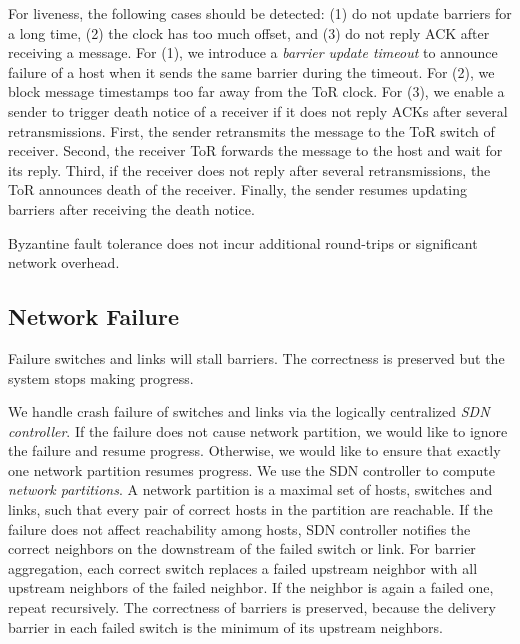 {For liveness, the following cases should be detected: (1) do not update barriers for a long time, (2) the clock has too much offset, and (3) do not reply ACK after receiving a message.
For (1), we introduce a \emph{barrier update timeout} to announce failure of a host when it sends the same barrier during the timeout. %
For (2), we block message timestamps too far away from the ToR clock.
For (3), we enable a sender to trigger death notice of a receiver if it does not reply ACKs after several retransmissions.
First, the sender retransmits the message to the ToR switch of receiver.
Second, the receiver ToR forwards the message to the host and wait for its reply.
Third, if the receiver does not reply after several retransmissions, the ToR announces death of the receiver.
Finally, the sender resumes updating barriers after receiving the death notice.

Byzantine fault tolerance does not incur additional round-trips or significant network overhead.



\subsection{Network Failure}
\label{sec:network-failure}

Failure  switches and links will stall barriers.
The correctness is preserved but the system stops making progress.

We handle crash failure of switches and links via the logically centralized \emph{SDN controller}.
If the failure does not cause network partition, we would like to ignore the failure and resume progress.
Otherwise, we would like to ensure that exactly one network partition resumes progress.
We use the SDN controller to compute \emph{network partitions}.
A network partition is a maximal set of hosts, switches and links, such that every pair of correct hosts in the partition are reachable.
If the failure does not affect reachability among hosts, SDN controller notifies the correct neighbors on the downstream of the failed switch or link.
For barrier aggregation, each correct switch replaces a failed upstream neighbor with all upstream neighbors of the failed neighbor.
If the neighbor is again a failed one, repeat recursively.
The correctness of barriers is preserved, because the delivery barrier in each failed switch is the minimum of its upstream neighbors. %

}
